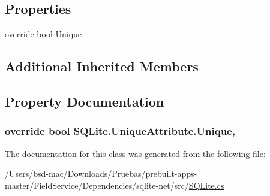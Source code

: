 \subsection*{Properties}
\begin{DoxyCompactItemize}
\item 
override bool \hyperlink{class_s_q_lite_1_1_unique_attribute_a7be9750f13a84999b4a53c45b1f84250}{Unique}
\end{DoxyCompactItemize}
\subsection*{Additional Inherited Members}


\subsection{Property Documentation}
\hypertarget{class_s_q_lite_1_1_unique_attribute_a7be9750f13a84999b4a53c45b1f84250}{
\subsubsection[{Unique}]{\setlength{\rightskip}{0pt plus 5cm}override bool S\+Q\+Lite.\+Unique\+Attribute.\+Unique\hspace{0.3cm}{\ttfamily [get]}, {\ttfamily [set]}}}\label{class_s_q_lite_1_1_unique_attribute_a7be9750f13a84999b4a53c45b1f84250}


The documentation for this class was generated from the following file\+:\begin{DoxyCompactItemize}
\item 
/\+Users/bsd-\/mac/\+Downloads/\+Pruebas/prebuilt-\/apps-\/master/\+Field\+Service/\+Dependencies/sqlite-\/net/src/\hyperlink{_s_q_lite_8cs}{S\+Q\+Lite.\+cs}\end{DoxyCompactItemize}
